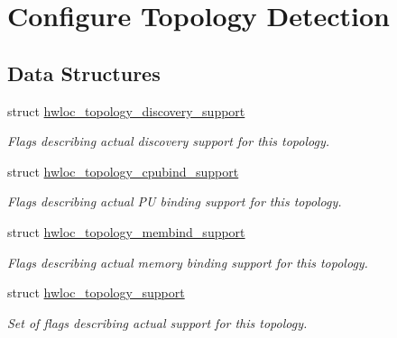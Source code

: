 \hypertarget{a00044}{
\section{Configure Topology Detection}
\label{a00044}
}
\subsection*{Data Structures}
\begin{DoxyCompactItemize}
\item 
struct \hyperlink{a00024}{hwloc\_\-topology\_\-discovery\_\-support}
\begin{DoxyCompactList}\small\item\em Flags describing actual discovery support for this topology. \item\end{DoxyCompactList}\item 
struct \hyperlink{a00023}{hwloc\_\-topology\_\-cpubind\_\-support}
\begin{DoxyCompactList}\small\item\em Flags describing actual PU binding support for this topology. \item\end{DoxyCompactList}\item 
struct \hyperlink{a00025}{hwloc\_\-topology\_\-membind\_\-support}
\begin{DoxyCompactList}\small\item\em Flags describing actual memory binding support for this topology. \item\end{DoxyCompactList}\item 
struct \hyperlink{a00026}{hwloc\_\-topology\_\-support}
\begin{DoxyCompactList}\small\item\em Set of flags describing actual support for this topology. \item\end{DoxyCompactList}\end{DoxyCompactItemize}
